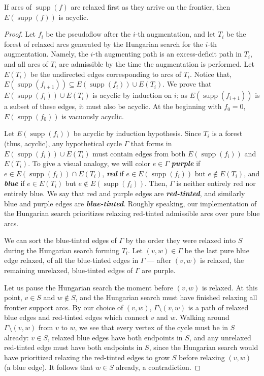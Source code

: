 \documentclass[a4paper,UKenglish]{socg-lipics-v2018}
\def\etal{\emph{et~al.}}
\def\etal{\textit{et~al.}}
\def\supp{\operatorname{supp}}
\theoremstyle{plain}
\numberwithin{figure}{section}
\def\EMPH#1{\textbf{\emph{\boldmath #1}}}
\begin{document}
\begin{toappendix}

\begin{lemmarep}[(Agarwal~\etal~\cite{AFPVX17})]
\label{lemma:orlin_acyclic}
If arcs of $\supp(f)$ are relaxed first as they arrive on the frontier, then
$E(\supp(f))$ is acyclic.
\end{lemmarep}

\begin{proof}
Let $f_i$ be the pseudoflow after the $i$-th augmentation, and let $T_i$ be the
forest of relaxed arcs generated by the Hungarian search for the $i$-th
augmentation.
Namely, the $i$-th augmenting path is an excess-deficit path in $T_i$, and all
arcs of $T_i$ are admissible by the time the augmentation is performed.
Let $E(T_i)$ be the undirected edges corresponding to arcs of $T_i$.
Notice that, $E(\supp(f_{i+1})) \subseteq E(\supp(f_i)) \cup E(T_i)$.
We prove that $E(\supp(f_i)) \cup E(T_i)$ is acyclic by induction on $i$;
as $E(\supp(f_{i+1}))$ is a subset of these edges, it must also be acyclic.
At the beginning with $f_0 = 0$, $E(\supp(f_0))$ is vacuously acyclic.

Let $E(\supp(f_i))$ be acyclic by induction hypothesis.
Since $T_i$ is a forest (thus, acyclic), any hypothetical cycle $\Gamma$ that
forms in $E(\supp(f_i)) \cup E(T_i)$ must contain edges from both
$E(\supp(f_i))$ and $E(T_i)$.
To give a visual analogy, we will color $e \in \Gamma$
\EMPH{purple} if $e \in E(\supp(f_i)) \cap E(T_i)$,
\EMPH{red} if $e \in E(\supp(f_i))$ but $e \not\in E(T_i)$,
and \EMPH{blue} if $e \in E(T_i)$ but $e \not\in E(\supp(f_i))$.
Then, $\Gamma$ is neither entirely red nor entirely blue.
We say that red and purple edges are \EMPH{red-tinted}, and similarly blue and
purple edges are \EMPH{blue-tinted}.
Roughly speaking, our implementation of the Hungarian search prioritizes
relaxing red-tinted admissible arcs over pure blue arcs. %

We can sort the blue-tinted edges of $\Gamma$ by the order they were relaxed
into $S$ during the Hungarian search forming $T_i$.
Let $(v, w) \in \Gamma$ be the last pure blue edge relaxed, of all the
blue-tinted edges in $\Gamma$ --- after $(v, w)$ is relaxed, the remaining
unrelaxed, blue-tinted edges of $\Gamma$ are purple.

Let us pause the Hungarian search the moment before $(v, w)$ is relaxed.
At this point, $v \in S$ and $w \not\in S$, and the Hungarian search must have
finished relaxing all frontier support arcs.
By our choice of $(v, w)$, $\Gamma \setminus (v, w)$ is a path of relaxed blue
edges and red-tinted edges which connect $v$ and $w$.
Walking around $\Gamma \setminus (v, w)$ from $v$ to $w$, we see that every
vertex of the cycle must be in $S$ already: $v \in S$, relaxed blue edges have
both endpoints in $S$, and any unrelaxed red-tinted edge must have both
endpoints in $S$, since the Hungarian search would have prioritized relaxing
the red-tinted edges to grow $S$ before relaxing $(v, w)$ (a blue edge).
It follows that $w \in S$ already, a contradiction.


\end{proof}
\end{toappendix}
\end{document}

